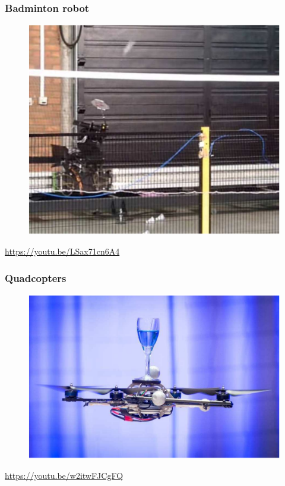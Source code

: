\documentclass{beamer}
\begin{document}

\begin{frame}
\frametitle{Badminton robot}
\begin{figure}
\includegraphics[scale=0.35]{badminton_robot}
\end{figure}
\url{https://youtu.be/LSax71cn6A4}
\end{frame}


\begin{frame}
\frametitle{Quadcopters}
\begin{figure}
\includegraphics[scale=0.35]{quadcopter}
\end{figure}
\url{https://youtu.be/w2itwFJCgFQ}
\end{frame}

\end{document}
